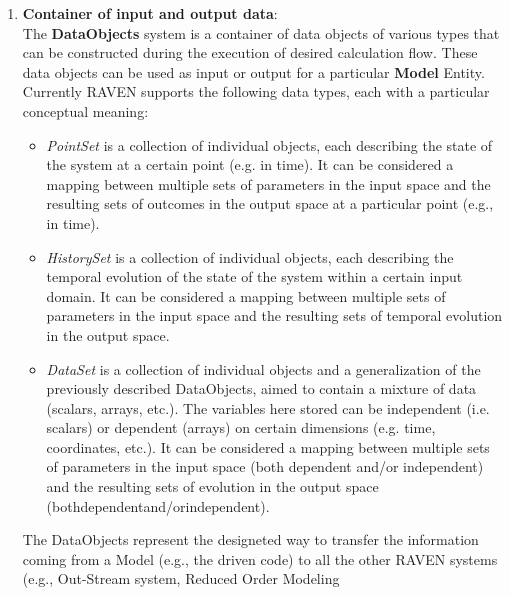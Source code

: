 \begin{enumerate}
   \item \textbf{Container of input and output data}: 
     \\The \textbf{DataObjects} system is a container of data objects of various types that can be constructed
     during the execution of desired calculation flow. These data objects can be used as input or output for a
     particular \textbf{Model} Entity. Currently RAVEN supports the following data types, each with a particular
     conceptual meaning:
     \begin{itemize}
        \item \textit{PointSet} is a collection of individual objects, each describing the state of the system at
                                a certain point (e.g. in time). It can be considered a mapping between multiple
                                            sets of parameters in the input space and the resulting sets of outcomes in the output 
                                            space  at a particular point (e.g., in time).
        \item \textit{HistorySet} is a collection of individual objects, each describing the temporal evolution of the
                                  state of the system within a certain input domain. It can be considered a mapping between
                                               multiple sets of parameters in the input space and the resulting sets of temporal 
                                               evolution in the output space.
        \item \textit{DataSet} is a collection of individual objects and a generalization of the previously described 
                                         DataObjects, aimed to contain a mixture of data (scalars, arrays, etc.). The variables here 
                                         stored can be independent (i.e. scalars) or dependent (arrays) on certain dimensions (e.g. 
                                         time, coordinates, etc.). It can be considered a mapping between multiple sets of 
                                         parameters in the input space (both dependent and/or independent) and the resulting sets 
                                         of evolution in the output space (bothdependentand/orindependent).                                      
     \end{itemize}
     The DataObjects represent the designeted way to transfer the information coming from a Model (e.g., the
     driven code) to all the other RAVEN systems (e.g., Out-Stream system, Reduced Order Modeling 

\end{enumerate}
